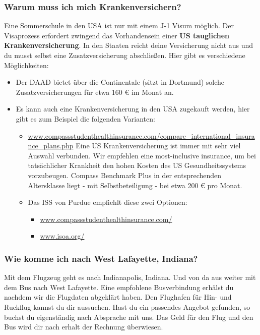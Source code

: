 \documentclass[
  paper=a4,
  fontsize=12pt,
  DIV=16,
  headheight=52pt,
  footheight=45pt,
  headinclude,
  parskip=full,
]{scrartcl}
\begin{document}
\subsubsection*{Warum muss ich mich Krankenversichern?}
Eine Sommerschule in den USA ist nur mit einem J-1 Visum möglich.
Der Visaprozess erfordert zwingend das Vorhandensein einer
\textbf{US tauglichen Krankenversicherung}.
In den Staaten reicht deine Versicherung nicht aus und du musst selbst eine
Zusatzversicherung abschließen.
Hier gibt es verschiedene Möglichkeiten:
\begin{itemize}
  \item Der DAAD bietet über die Continentale (sitzt in Dortmund) solche
  Zusatzversicherungen für etwa 160 € im Monat an.
  \item Es kann auch eine Krankenversicherung in den USA zugekauft werden, hier
  gibt es zum Beispiel die folgenden Varianten:
  \begin{itemize}
    \item \url{www.compassstudenthealthinsurance.com/compare_international_insurance_plans.php}
    Eine US Krankenversicherung ist immer mit sehr viel Auswahl verbunden.
    Wir empfehlen eine most-inclusive insurance, um bei tatsächlicher Krankheit
    den hohen Kosten des US Gesundheitssystems vorzubeugen.
    Compass Benchmark Plus in der entsprechenden Altersklasse liegt - mit
    Selbstbeteiligung - bei etwa 200 € pro Monat.
    \item Das ISS von Purdue empfiehlt diese zwei Optionen:
    \begin{itemize}
      \item \url{www.compassstudenthealthinsurance.com/}
      \item \url{www.isoa.org/}
    \end{itemize}
  \end{itemize}
\end{itemize}

\subsubsection*{Wie komme ich nach West Lafayette, Indiana?}
Mit dem Flugzeug geht es nach Indianapolis, Indiana. Und von da aus weiter
mit dem Bus nach West Lafayette.
Eine empfohlene Busverbindung erhälst du nachdem wir die Flugdaten abgeklärt
haben.
Den Flughafen für Hin- und Ruckflug kannst du dir aussuchen.
Hast du ein passendes Angebot gefunden, so buchst du eigenständig nach Absprache
mit uns. Das Geld für den Flug und den Bus wird dir nach erhalt der Rechnung
überwiesen.
\end{document}
